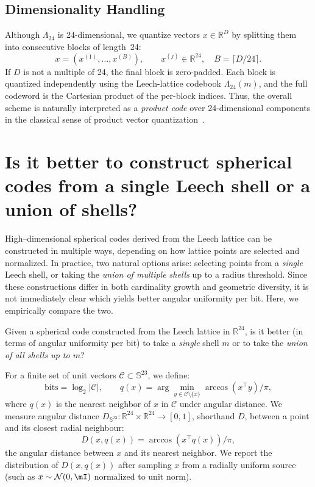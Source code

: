 \documentclass{article}
\theoremstyle{plain}
\theoremstyle{definition}
\theoremstyle{remark}
\begin{document}
\subsection{Dimensionality Handling}
Although $\Lambda_{24}$ is 24-dimensional, we quantize vectors $x \in \mathbb{R}^D$ by splitting them into consecutive blocks of length~24:
\[
x = (x^{(1)},\dots,x^{(B)}), \qquad x^{(j)} \in \mathbb{R}^{24}, \quad B = \lceil D/24 \rceil.
\]
If $D$ is not a multiple of 24, the final block is zero-padded. Each block is quantized independently using the Leech-lattice codebook $\Lambda_{24}(m)$, and the full codeword is the Cartesian product of the per-block indices. Thus, the overall scheme is naturally interpreted as a \emph{product code} over 24-dimensional components in the classical sense of product vector quantization~\citep{gray1998quantization}.




\newpage
\section{Is it better to construct spherical codes from a single Leech shell or a union of shells?}
\label{app:union-of-shells}

High–dimensional spherical codes derived from the Leech lattice can be constructed in multiple ways, depending on how lattice points are selected and normalized. In practice, two natural options arise: selecting points from a \emph{single} Leech shell, or taking the \emph{union of multiple shells} up to a radius threshold. Since these constructions differ in both cardinality growth and geometric diversity, it is not immediately clear which yields better angular uniformity per bit. Here, we empirically compare the two.

Given a spherical code constructed from the Leech lattice in \(\mathbb{R}^{24}\), is it better (in terms of angular uniformity per bit) to take a \emph{single} shell \(m\) or to take the \emph{union of all shells up to \(m\)}?

For a finite set of unit vectors \(\mathcal{C} \subset \mathbb{S}^{23}\), we define:
\[
\text{bits} = \log_2|\mathcal{C}|,\qquad 
q(x) = \arg\min_{y \in \mathcal{C}\setminus\{x\}} \arccos (x^{\top} y ) / \pi,
\]
where \(q(x)\) is the nearest neighbor of \(x\) in \(\mathcal{C}\) under angular distance. We measure angular distance \(D_{\mathbb{S}^{23}} : \mathbb{R}^{24} \times \mathbb{R}^{24} \to [0, 1]\), shorthand \(D\), between a point and its closest radial neighbour:
\[
D(x, q(x)) = \arccos (x^{\top} q(x)) / \pi,
\]
the angular distance between \(x\) and its nearest neighbor. We report the distribution of \(D(x, q(x))\) after sampling \(x\) from a radially uniform source (such as \(x \sim \mathcal{N}(0,\mI)\) normalized to unit norm).
\end{document}

